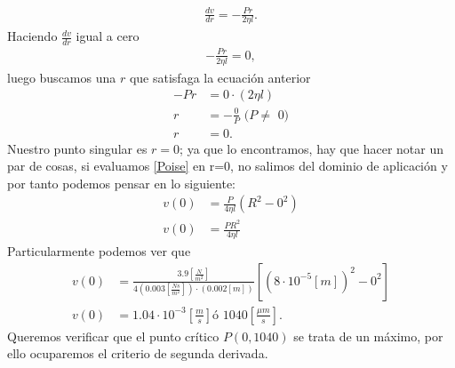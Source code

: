 \begin{align*}
    \frac{dv}{dr}=-\frac{Pr}{2\eta l}.
\end{align*}
Haciendo $\frac{dv}{dr}$ igual a cero
\begin{align*}
    -\frac{Pr}{2\eta l}=0,
\end{align*}
luego buscamos una $r$ que satisfaga la ecuación anterior
\begin{align*}
    -Pr&=0\cdot(2\eta l)\\
    r&=-\frac{0}{P} \text{\ ($P\neq$ 0)}\\
    r&=0.
\end{align*}
Nuestro punto singular es $r=0$; ya que lo encontramos, hay que hacer notar un par de cosas, si evaluamos \ref{Poise} en r=0, no salimos del dominio de aplicación y por tanto podemos pensar en lo siguiente:
\begin{align*}
    v(0)&=\frac{P}{4\eta l}(R^{2}-0^{2})\\
    v(0)&=\frac{PR^2}{4 \eta l}
\end{align*}
Particularmente podemos ver que
\begin{align*}
    v(0)&=\frac{3.9\left[\frac{N}{m^2}\right]}{4\left(0.003\left[\frac{Ns}{m^2}\right]\right)\cdot\left(0.002\left[m\right]\right)}\left[\left(8\cdot10^{-5}\left[m\right]\right)^{2}-0^{2}\right]\\
    v(0)&=1.04\cdot10^{-3} \left[\frac{m}{s}\right] \text{ó } 1040\left[\frac{\mu m}{s}\right].
\end{align*}
Queremos verificar que el punto crítico $P(0,1040)$ se trata de un máximo, por ello ocuparemos el criterio de segunda derivada.\\ \\

